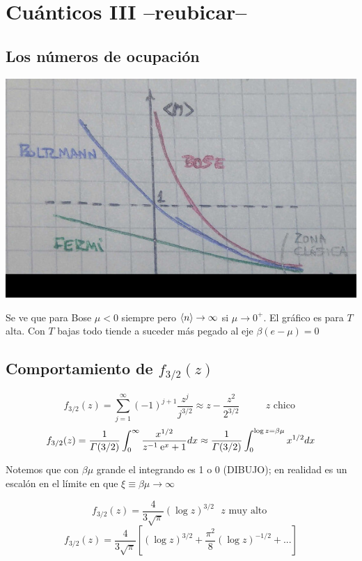 \documentclass[10pt,oneside]{CBFT_book}
\begin{document}
\section{Cuánticos III --reubicar--}
 
 \subsection{Los números de ocupación}
 
 
 \includegraphics[scale=0.4]{images/1625624267.jpg}
 
 Se ve que para Bose $ \mu < 0 $ siempre pero $ \braket{n} \to \infty $ si $ \mu \to 0^+ $.
 El gráfico es para $T$ alta. Con $ T $ bajas todo tiende a suceder más pegado al eje $ \beta(e-\mu) = 0 $
 
 \subsection{Comportamiento de $ f_{3/2}(z) $}
 
 \[
	f_{3/2}(z) = \sum_{j=1}^\infty (-1)^{j+1}\frac{z^j}{j^{3/2}} \approx z - \frac{z^2}{2^{3/2}} \qquad 
	\text{ $z$ chico }
 \]
 \[
 	f_{3/2}(z) = \frac{1}{\Gamma(3/2)} \int_0^\infty \frac{x^{1/2}}{z^{-1}\:\mathrm{e}^{x} + 1} dx \approx  
 	\frac{1}{\Gamma(3/2)} \int_0^{\log z = \beta\mu} x^{1/2} dx
 \]
 
Notemos que con $ \beta \mu $ grande el integrando es 1 o 0 (DIBUJO); en realidad es un escalón en el límite
en que $ \xi \equiv \beta\mu \to \infty$

\[
	f_{3/2}(z) = \frac{4}{ 3 \sqrt{\pi} } (\log z )^{3/2} \text{ $z$ muy alto }
\]
\[
	f_{3/2}(z) = \frac{4}{ 3 \sqrt{\pi} } \left[ (\log z )^{3/2} + \frac{\pi^2}{8}(\log z )^{-1/2} + ... \right]
\]
\end{document}
